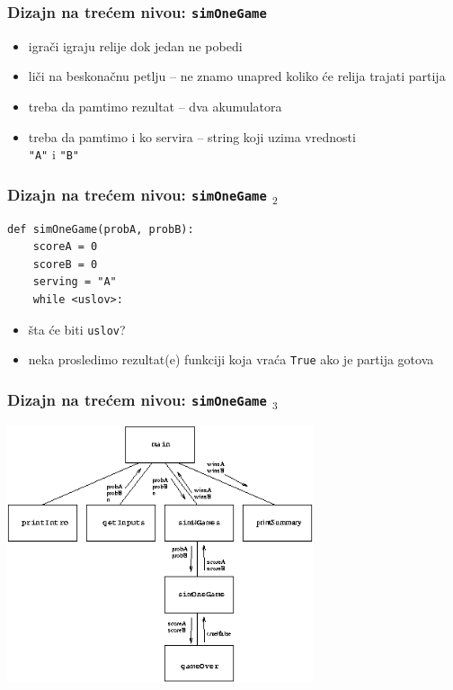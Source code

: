 \documentclass[utf8,compress]{beamer}
\begin{document}
\begin{frame}[fragile]
  \frametitle{Dizajn na trećem nivou: \texttt{simOneGame}}
\begin{itemize}
  \item igrači igraju relije dok jedan ne pobedi
  \item liči na beskonačnu petlju -- ne znamo unapred koliko će relija trajati partija
  \item treba da pamtimo rezultat -- dva akumulatora
  \item treba da pamtimo i ko servira -- string koji uzima vrednosti \\ \texttt{"A"} i \texttt{"B"}
\end{itemize}
\end{frame}

\begin{frame}[fragile]
  \frametitle{Dizajn na trećem nivou: \texttt{simOneGame} $_2$}
\begin{verbatim}
def simOneGame(probA, probB):
    scoreA = 0
    scoreB = 0
    serving = "A"
    while <uslov>:
\end{verbatim}
\begin{itemize}
  \item šta će biti \texttt{uslov}?
  \item neka prosledimo rezultat(e) funkciji koja vraća \texttt{True} ako je partija gotova
\end{itemize}
\end{frame}

\begin{frame}
  \frametitle{Dizajn na trećem nivou: \texttt{simOneGame} $_3$}
\begin{center}
  \includegraphics[width=9cm]{pic24}
\end{center}
\end{frame}
\end{document}
